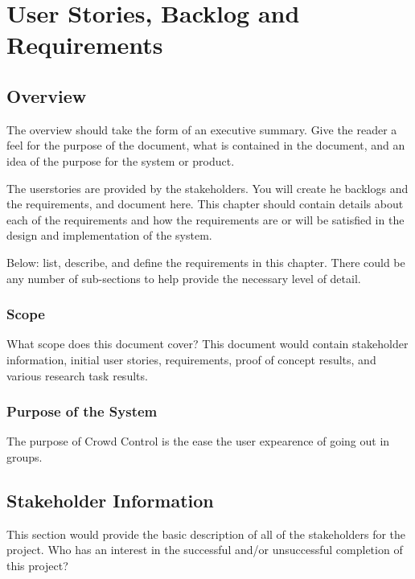 \chapter{User Stories, Backlog and Requirements}
\section{Overview}


The overview should take the form of an executive summary.  Give the reader a feel 
for the purpose of the document, what is contained in the document, and an idea 
of the purpose for the system or product. 

 The userstories 
are provided by the stakeholders.  You will create he backlogs and the requirements, and document here.  
This chapter should contain 
details about each of the requirements and how the requirements are or will be 
satisfied in the design and implementation of the system.

Below:   list, describe, and define the requirements in this chapter.  
There could be any number of sub-sections to help provide the necessary level of 
detail. 





\subsection{Scope}


What scope does this document cover?  This document would contain stakeholder information, 
initial user stories, requirements, proof of concept results, and various research 
task results. 



\subsection{Purpose of the System}
The purpose of Crowd Control is the ease the user expearence of going out in groups.


\section{ Stakeholder Information}


This section would provide the basic description of all of the stakeholders for 
the project.  Who has an interest in the successful and/or unsuccessful completion 
of this project? 


